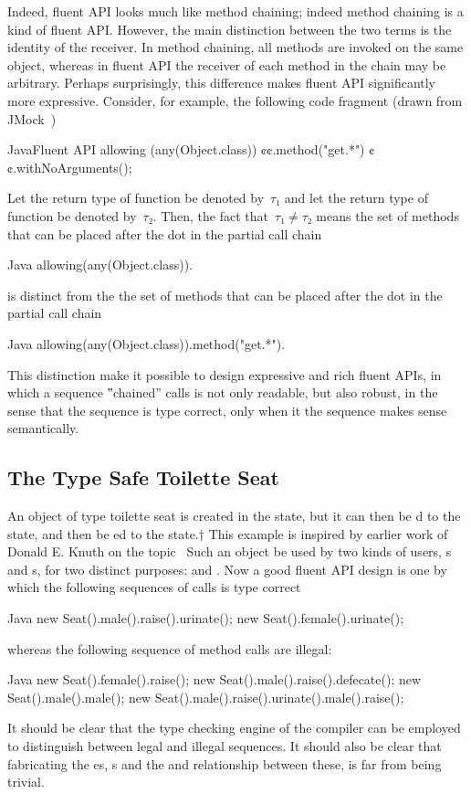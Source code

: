 Indeed, fluent API looks much like method chaining; indeed method chaining is a kind
  of fluent API{}.
However, the main distinction between the two terms is the identity of the receiver.
In method chaining, all methods are invoked on the same object, whereas in fluent API
  the receiver of each method in the chain may be arbitrary.
Perhaps surprisingly, this difference makes fluent API significantly more expressive.
Consider, for example, the following code fragment (drawn from JMock~\cite{Freeman:Pryce:06})
\begin{lCode}{Java}{Fluent API}
allowing (any(Object.class))
  ¢¢.method("get.*")
  ¢¢.withNoArguments();
\end{lCode}
Let the return type of function  be denoted by~$τ₁$ and let the return type of function  be denoted by~$τ₂$.
Then, the fact that~$τ₁≠τ₂$ means the set of methods that can be placed after the dot
in the partial call chain
\begin{lcode}{Java}
   allowing(any(Object.class)).
\end{lcode}
is distinct from the the set of methods that can be placed after the dot in the partial call chain
\begin{lcode}{Java}
  allowing(any(Object.class)).method("get.*").
\end{lcode}
This distinction make it possible to design expressive and rich fluent APIs, in which a sequence ‟chained” calls is not only readable, but also
robust, in the sense that the sequence is type correct, only when it the sequence makes sense semantically.

\subsection{The Type Safe Toilette Seat}

An object of type toilette seat is created in the  state, but it can
then be d to the  state, and then be ed to the
 state.†{%
This example is inspired by earlier work of Donald E. Knuth on the topic~\cite{Knuth:92}}
Such an object be used by two kinds of users, s and s, for two distinct purposes:  and .
Now a good fluent API design is one by which the following sequences of calls is type correct
\begin{lcode}{Java}
  new Seat().male().raise().urinate();
  new Seat().female().urinate();
 \end{lcode}
whereas the following sequence of method calls are illegal:
\begin{lcode}{Java}
   new Seat().female().raise();
   new Seat().male().raise().defecate();
   new Seat().male().male();
   new Seat().male().raise().urinate().male().raise();
 \end{lcode}
It should be clear that the type checking engine of the compiler can
be employed to distinguish between legal and illegal sequences.
It should also be clear that fabricating the es, s
and the  and  relationship between these, is
far from being trivial.

